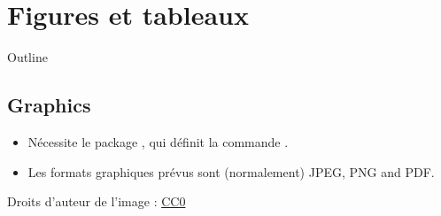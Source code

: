 \documentclass{beamer}
\begin{document}
\section{Figures et tableaux}

\begin{frame}{Outline}
\begin{multicols}{2}
\tableofcontents[currentsection]
\end{multicols}
\end{frame}

\subsection{Graphics}
\begin{frame}[fragile]{\insertsubsection}
\begin{itemize}
\item Nécessite le package , qui définit la commande
.
\item Les formats graphiques prévus sont (normalement) JPEG, PNG and PDF.
\end{itemize}

\tiny{Droits d'auteur de l'image : \href{https://pixabay.com/en/animal-apple-attractive-beautiful-1239390/}{CC0}}
\end{frame}
\end{document}
